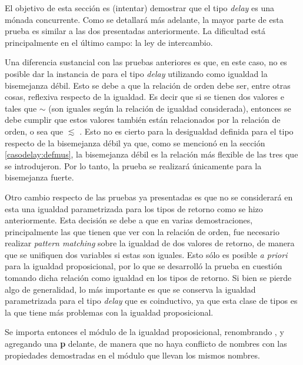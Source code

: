El objetivo de esta sección es (intentar) demostrar que el tipo \textit{delay} es una mónada concurrente. Como se detallará más adelante, la mayor parte de esta prueba es similar a las dos presentadas anteriormente. La dificultad está principalmente en el último campo: la ley de intercambio. 

Una diferencia sustancial con las pruebas anteriores es que, en este caso, no es posible dar la instancia de  para el tipo \textit{delay} utilizando como igualdad la bisemejanza débil. Esto se debe a que la relación de orden debe ser, entre otras cosas, reflexiva respecto de la igualdad. Es decir que si se tienen dos valores  e  tales que  $\sim$  (son iguales según la relación de igualdad considerada), entonces se debe cumplir que estos valores también están relacionados por la relación de orden, o sea que  $\lesssim$ . Esto no es cierto para la desigualdad definida para el tipo \AgdaDatatype{$\_\bot$} respecto de la bisemejanza débil ya que, como se mencionó en la sección \ref{casodelay:defmus}, la bisemejanza débil es la relación más flexible de las tres que se introdujeron. Por lo tanto, la prueba se realizará únicamente para la bisemejanza fuerte. 

Otro cambio respecto de las pruebas ya presentadas es que no se considerará en esta una igualdad parametrizada para los tipos de retorno como se hizo anteriormente. Esta decisión se debe a que en varias demostraciones, principalmente las que tienen que ver con la relación de orden, fue necesario realizar \textit{pattern matching} sobre la igualdad de dos valores de retorno, de manera que se unifiquen dos variables si estas son iguales. Esto sólo es posible \textit{a priori} para la igualdad proposicional, por lo que se desarrolló la prueba en cuestión tomando dicha relación como igualdad en los tipos de retorno. Si bien se pierde algo de generalidad, lo más importante es que se conserva la igualdad parametrizada para el tipo \textit{delay} que es coinductivo, ya que esta clase de tipos es la que tiene más problemas con la igualdad proposicional.

Se importa entonces el módulo de la igualdad proposicional, renombrando ,  y  agregando una \textbf{p} delante, de manera que no haya conflicto de nombres con las propiedades demostradas en el módulo  que llevan los mismos nombres. 

